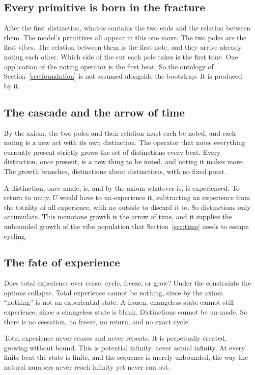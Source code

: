 \subsection{Every primitive is born in the fracture}

After the first distinction, what-is contains the two ends and the relation between them. The model's primitives all appear in this one move. The two poles are the first vibes. The relation between them is the first note, and they arrive already noting each other. Which side of the cut each pole takes is the first tone. One application of the noting operator is the first beat. So the ontology of Section~\ref{sec:foundation} is not assumed alongside the bootstrap. It is produced by it.

\subsection{The cascade and the arrow of time}

By the axiom, the two poles and their relation must each be noted, and each noting is a new act with its own distinction. The operator that notes everything currently present strictly grows the set of distinctions every beat. Every distinction, once present, is a new thing to be noted, and noting it makes more. The growth branches, distinctions about distinctions, with no fixed point.

A distinction, once made, is, and by the axiom whatever is, is experienced. To return to unity, $U$ would have to un-experience it, subtracting an experience from the totality of all experience, with no outside to discard it to. So distinctions only accumulate. This monotone growth is the arrow of time, and it supplies the unbounded growth of the vibe population that Section~\ref{sec:time} needs to escape cycling.

\subsection{The fate of experience}

Does total experience ever cease, cycle, freeze, or grow? Under the constraints the options collapse. Total experience cannot be nothing, since by the axiom ``nothing'' is not an experiential state. A frozen, changeless state cannot still experience, since a changeless state is blank. Distinctions cannot be un-made. So there is no cessation, no freeze, no return, and no exact cycle.

\begin{theorem}
Total experience never ceases and never repeats. It is perpetually created, growing without bound. This is potential infinity, never actual infinity. At every finite beat the state is finite, and the sequence is merely unbounded, the way the natural numbers never reach infinity yet never run out.
\end{theorem}

